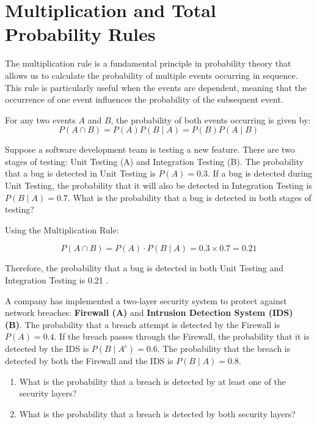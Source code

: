 \section{Multiplication and Total Probability Rules}
The multiplication rule is a fundamental principle in probability theory that allows us to calculate the probability of multiple events occurring in sequence. This rule is particularly useful when the events are dependent, meaning that the occurrence of one event influences the probability of the subsequent event.

\begin{theorem}
    For any two events \( A \) and \( B \), the probability of both events occurring is given by:
    \[
    P(A \cap B) = P(A) P(B \mid A) = P(B) P(A \mid B)
    \]
\end{theorem}

\begin{example}
    Suppose a software development team is testing a new feature. There are two stages of testing: Unit Testing (A) and Integration Testing (B). The probability that a bug is detected in Unit Testing is $P(A)=0.3$. If a bug is detected during Unit Testing, the probability that it will also be detected in Integration Testing is $P(B \mid A) = 0.7$. What is the probability that a bug is detected in both stages of testing?
\end{example}

\begin{solution}
    Using the Multiplication Rule:

\[
P(A \cap B)=P(A) \cdot P(B \mid A)=0.3 \times 0.7=0.21
\]


Therefore, the probability that a bug is detected in both Unit Testing and Integration Testing is 0.21 .
\end{solution}

\begin{example}
A company has implemented a two-layer security system to protect against network breaches: \textbf{Firewall (A)} and \textbf{Intrusion Detection System (IDS) (B)}. The probability that a breach attempt is detected by the Firewall is \( P(A) = 0.4 \). If the breach passes through the Firewall, the probability that it is detected by the IDS is \( P(B \mid A^c) = 0.6 \). The probability that the breach is detected by both the Firewall and the IDS is \( P(B \mid A) = 0.8 \).

\begin{enumerate}[label=(\alph*)]
    \item What is the probability that a breach is detected by at least one of the security layers?
    \item What is the probability that a breach is detected by both security layers?
\end{enumerate}

\end{example}


